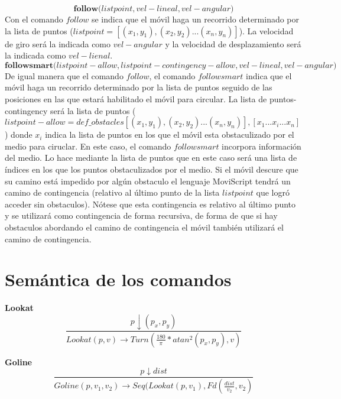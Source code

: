 \documentclass[11pt]{scrartcl}
\begin{document}
\begin{equation*}
\textbf{follow(}listpoint , vel-lineal , vel-angular \textbf{)}
\end{equation*}
Con el comando $follow$ se indica que el m\'ovil haga un recorrido determinado
por la lista de puntos ($listpoint = [(x_1,y_1),(x_2,y_2)...(x_n,y_n)]$).
\newline
La velocidad de giro ser\'a la indicada como $vel-angular$ y la velocidad de desplazamiento
ser\'a la indicada como $vel-lienal$.
\begin{equation*}
\textbf{followsmart(}listpoint-allow , listpoint-contingency-allow , vel-lineal , vel-angular \textbf{)}
\end{equation*}                
De igual manera que el comando $follow$, el comando $followsmart$
 indica que el m\'ovil haga un recorrido determinado
por la lista de puntos seguido de las posiciones en las que estar\'a habilitado el m\'ovil 
para circular. La lista de puntos-contingency ser\'a la lista de puntos
($listpoint-allow = def\_obstacles [(x_1,y_1),(x_2,y_2)...(x_n,y_n)], [x_1 ... x_i ... x_n]$) donde
$x_i$ indica la lista de puntos en los que el m\'ovil esta obstaculizado por el medio para ciruclar.
\newline
En este caso, el comando $followsmart$ incorpora informaci\'on del medio. Lo hace mediante la lista de puntos que en este caso
ser\'a una lista de \'indices en los que los puntos obstaculizados por el medio.
\newline
Si  el m\'ovil descure que su camino est\'a impedido por alg\'un obstaculo el lenguaje MoviScript tendr\'a un camino de contingencia 
(relativo al \'ultimo punto de la lista $listpoint$ que logr\'o acceder sin obstaculos). N\'otese que 
esta contingencia es relativo al \'ultimo punto y se utilizar\'a como contingencia de forma 
recursiva, de forma de que si hay obstaculos abordando el camino de contingencia el m\'ovil 
tambi\'en utilizar\'a el camino de contingencia.

\section{Sem\'antica de los comandos}

\textbf{Lookat}
\[
 \frac{p \downarrow (p_x,p_y)}{Lookat(p, v) \to Turn( \frac{180} {\pi} * atan^2(p_x, p_y) , v)}
\]

\textbf{Goline}
\[
 \frac{p \downarrow dist}{Goline (p,v_1,v_2) \to Seq( Lookat(p, v_1) , Fd (\frac{dist}{v_2}, v_2)}
\]
\end{document}
